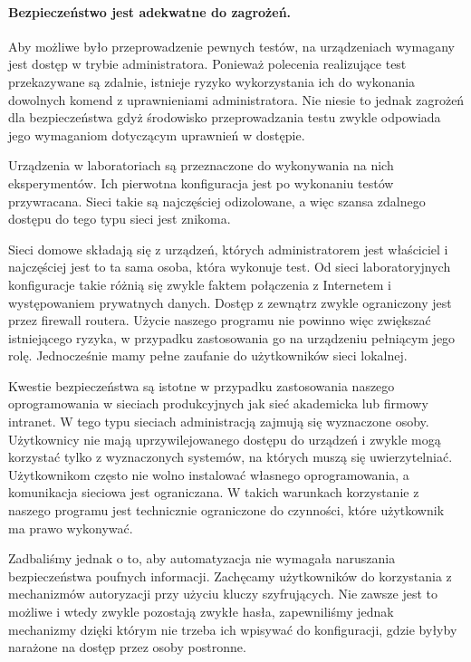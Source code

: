 \documentclass[00-praca-magisterska.tex]{subfiles}
\begin{document}
\paragraph{Bezpieczeństwo jest adekwatne do zagrożeń.} Aby możliwe było
przeprowadzenie pewnych testów, na urządzeniach wymagany jest dostęp w trybie
administratora. Ponieważ polecenia realizujące test przekazywane są zdalnie,
istnieje ryzyko wykorzystania ich do wykonania dowolnych komend z uprawnieniami
administratora. Nie niesie to jednak zagrożeń dla bezpieczeństwa gdyż środowisko
przeprowadzania testu zwykle odpowiada jego wymaganiom dotyczącym uprawnień w
dostępie.

Urządzenia w laboratoriach są przeznaczone do wykonywania na nich
eksperymentów.  Ich pierwotna konfiguracja jest po wykonaniu testów
przywracana. Sieci takie są najczęściej odizolowane, a więc szansa zdalnego
dostępu do tego typu sieci jest znikoma.

Sieci domowe składają się z urządzeń, których administratorem jest właściciel i
najczęściej jest to ta sama osoba, która wykonuje test. Od sieci laboratoryjnych
konfiguracje takie różnią się zwykle faktem połączenia z Internetem i
występowaniem prywatnych danych. Dostęp z zewnątrz zwykle ograniczony jest przez
firewall routera. Użycie naszego programu nie powinno więc zwiększać
istniejącego ryzyka, w przypadku zastosowania go na urządzeniu pełniącym jego
rolę. Jednocześnie mamy pełne zaufanie do użytkowników sieci lokalnej.

Kwestie bezpieczeństwa są istotne w przypadku zastosowania naszego
oprogramowania w sieciach produkcyjnych jak sieć akademicka lub firmowy
intranet. W tego typu sieciach administracją zajmują się wyznaczone osoby.
Użytkownicy nie mają uprzywilejowanego dostępu do urządzeń i zwykle mogą
korzystać tylko z wyznaczonych systemów, na których muszą się uwierzytelniać.
Użytkownikom często nie wolno instalować własnego oprogramowania, a komunikacja
sieciowa jest ograniczana. W takich warunkach korzystanie z naszego programu
jest technicznie ograniczone do czynności, które użytkownik ma prawo wykonywać. 

Zadbaliśmy jednak o to, aby automatyzacja nie wymagała naruszania
bezpieczeństwa poufnych informacji. Zachęcamy użytkowników do korzystania z
mechanizmów autoryzacji przy użyciu kluczy szyfrujących. Nie zawsze jest to
możliwe i wtedy zwykle pozostają zwykłe hasła, zapewniliśmy jednak mechanizmy
dzięki którym nie trzeba ich wpisywać do konfiguracji, gdzie byłyby narażone na
dostęp przez osoby postronne.
\end{document}

